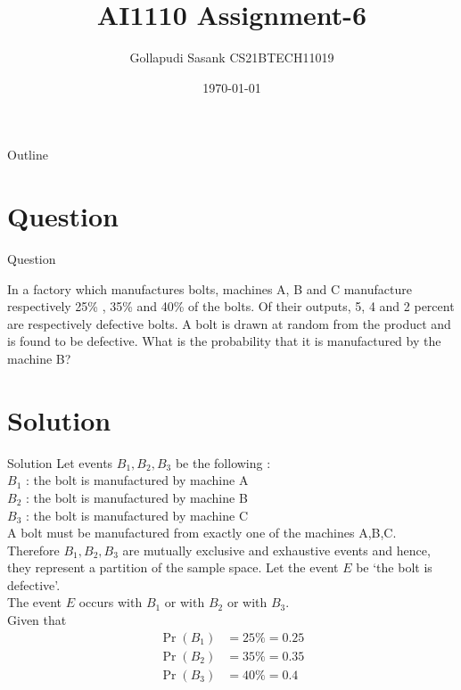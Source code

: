 \documentclass{beamer}
\title{AI1110 Assignment-6}
\author{Gollapudi Sasank CS21BTECH11019}
\date{\today}
\providecommand{\pr}[1]{\ensuremath{\Pr\left(#1\right)}}
\begin{document}
\begin{frame}
    \titlepage 
\end{frame}

\logo{}


\begin{frame}{Outline}
    \tableofcontents
\end{frame}


\section{Question}
\begin{frame}{Question}

In a factory which manufactures bolts, machines A, B and
C manufacture respectively 25\% , 35\% and 40\% of the bolts.
Of their outputs, 5, 4 and 2 percent are respectively defective
bolts. A bolt is drawn at random from the product and is found
to be defective. What is the probability that it is manufactured
by the machine B?

\end{frame}


\section{Solution}
\begin{frame}{Solution}
 Let  events $B_1,B_2,B_3$ be the following : \\
$B_1$ : the bolt is manufactured by machine A \\
$B_2$ : the bolt is manufactured by machine B \\
$B_3$ : the bolt is manufactured by machine C \\
A bolt must be manufactured from exactly one of the machines A,B,C.\\
Therefore $B_1,B_2,B_3$ are mutually exclusive and exhaustive events and hence, they represent a partition of the sample space.
Let the event $E$ be `the bolt is defective'.\\
The event $E$ occurs with $B_1$ or with $B_2$ or with $B_3$.\\
Given that 
\begin{align}
\pr{B_1} &= 25\% = 0.25 \\
\pr{B_2} &= 35\% = 0.35 \\
\pr{B_3} &= 40\% = 0.4 
\end{align} 
\end{frame} 
\end{document}
